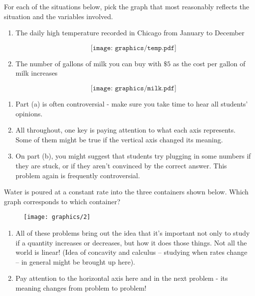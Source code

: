 \documentclass{ximera}
\begin{document}
\begin{problem}
For each of the situations below, pick the graph that most reasonably
reflects the situation and the variables involved.

\begin{enumerate}
\item The daily high temperature recorded in Chicago from January to
  December

\[
\texttt{[image: graphics/temp.pdf]}
\]

\item The number of gallons of milk you can buy with $\$5$ as the cost per gallon of
  milk increases

\[
\texttt{[image: graphics/milk.pdf]}
\]

\end{enumerate}


\begin{instructorNotes}
\begin{enumerate}
    \item Part (a) is often controversial - make sure you take time to hear all students' opinions.
    \item All throughout, one key is paying attention to what each axis represents.  Some of them might be true if the vertical axis changed its meaning.
    \item On part (b), you might suggest that students try plugging in some numbers if they are stuck, or if they aren't convinced by the correct answer.  This problem again is frequently controversial.
\end{enumerate}
\end{instructorNotes}




\end{problem}



\begin{problem}
Water is poured at a constant rate into the three containers shown
below. Which graph corresponds to which container?

\begin{figure}[h]
\begin{center}
\texttt{[image: graphics/2]}
\end{center}
\end{figure}



\begin{instructorNotes}
\begin{enumerate}
    \item All of these problems bring out the idea that it's important not only to study if a quantity increases or decreases, but how it does those things.  Not all the world is linear! (Idea of concavity and calculus – studying when rates change – in general might be brought up here).
    \item Pay attention to the horizontal axis here and in the next problem - its meaning changes from problem to problem!
\end{enumerate}
\end{instructorNotes}
\end{problem}
\end{document}
